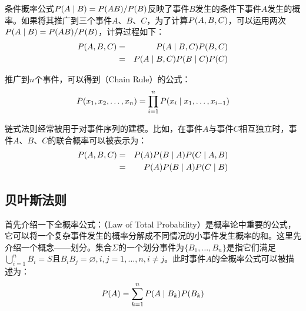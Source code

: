 \parinterval 条件概率公式${P}(A \mid B)={P}(AB)/{P}(B)$反映了事件$B$发生的条件下事件$A$发生的概率。如果将其推广到三个事件$A$、$B$、$C$，为了计算${P}(A,B,C)$，可以运用两次${P}(A \mid B)={P}(AB)/{P}(B)$，计算过程如下：
\begin{eqnarray}
{P}(A,B,C) & = & {P}(A \mid B ,C){P}(B,C) \nonumber \\
                           & = & {P}(A \mid B,C){P}(B \mid C){P}(C)
\label{eq:2-5}
\end{eqnarray}

\parinterval 推广到$n$个事件，可以得到{\small{}}（Chain Rule）的公式：
\begin{eqnarray}
{P}(x_1,x_2, \ldots ,x_n)=\prod_{i=1}^n {P}(x_i \mid x_1, \ldots ,x_{i-1})
\label{eq:2-6}
\end{eqnarray}

\parinterval 链式法则经常被用于对事件序列的建模。比如，在事件$A$与事件$C$相互独立时，事件$A$、$B$、$C$的联合概率可以被表示为：
\begin{eqnarray}
{P}(A,B,C) & = & {P}(A){P}(B \mid A){P}(C \mid A,B) \nonumber \\
                & = & {P}(A){P}(B \mid A){P}(C \mid B)
\label{eq:chain-rule-example}
\end{eqnarray}


\subsection{贝叶斯法则}\label{sec:2.2.3}

\parinterval 首先介绍一下全概率公式：{\small{}}（Law of Total Probability）是概率论中重要的公式，它可以将一个复杂事件发生的概率分解成不同情况的小事件发生概率的和。这里先介绍一个概念——划分。集合$\Sigma$的一个划分事件为$\{B_1, \ldots ,B_n\}$是指它们满足$\bigcup_{i=1}^n B_i=S \textrm{且}B_iB_j=\varnothing , i,j=1, \ldots ,n,i\neq j$。此时事件$A$的全概率公式可以被描述为：
\begin{eqnarray}
{P}(A)=\sum_{k=1}^n {P}(A \mid B_k){P}(B_k)
\label{eq:2-9}
\end{eqnarray}

